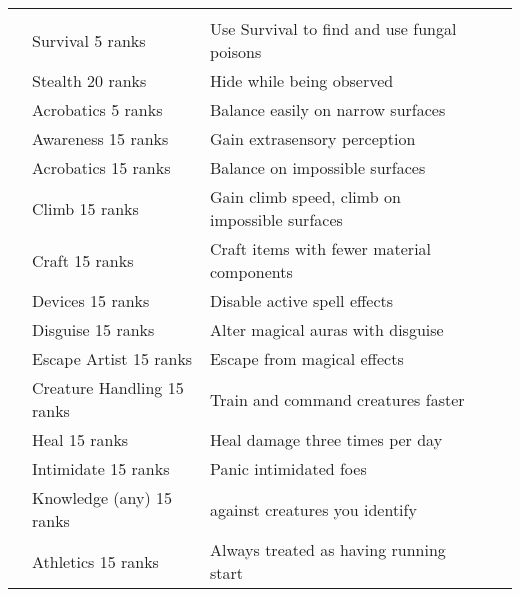 \begin{longtabuwrapper}
\begin{longtabu}{>{\lcol}p{10em} >{\lcol}p{15em} >{\lcol}X >{\lcol}p{8em} >{\lcol}p{3em}}
        \midrule
         &  &  &  &  \\
         & Survival 5 ranks & Use Survival to find and use fungal poisons & \x &  \\
         & Stealth 20 ranks & Hide while being observed & \x &  \\
         & Acrobatics 5 ranks & Balance easily on narrow surfaces & \x &  \\
         & Awareness 15 ranks & Gain extrasensory perception & \x &  \\
         & Acrobatics 15 ranks & Balance on impossible surfaces & \x &  \\
         & Climb 15 ranks & Gain climb speed, climb on impossible surfaces & \x &  \\
         & Craft 15 ranks & Craft items with fewer material components & \x &  \\
         & Devices 15 ranks & Disable active spell effects & \x &  \\
         & Disguise 15 ranks & Alter magical auras with disguise & \x &  \\
         & Escape Artist 15 ranks & Escape from magical effects & \x &  \\
         & Creature Handling 15 ranks & Train and command creatures faster & \x &  \\
         & Heal 15 ranks & Heal damage three times per day & \x &  \\
         & Intimidate 15 ranks & Panic intimidated foes & \x &  \\
         & Knowledge (any) 15 ranks &  against creatures you identify & \x &  \\
         & Athletics 15 ranks & Always treated as having running start & \x &  \\

\end{longtabu}
\end{longtabuwrapper}
